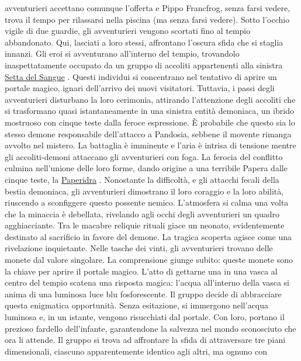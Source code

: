 avventurieri accettano comunque l'offerta e Pippo Francfrog, senza farsi
vedere, trova il tempo per rilassarsi nella piscina (ma senza farsi
vedere). Sotto l'occhio vigile di due guardie, gli avventurieri vengono
scortati fino al tempio abbandonato. Qui, lasciati a loro stessi,
affrontano l'oscura sfida che si staglia innanzi. Gli eroi si
avventurano all'interno del tempio, trovandolo inaspettatamente occupato
da un gruppo di accoliti appartenenti alla sinistra
\href{Setta\%20del\%20Sangue\%202859c4de945546eda0cee6fb151ef956.md}{Setta
del Sangue} . Questi individui si concentrano nel tentativo di aprire un
portale magico, ignari dell'arrivo dei nuovi visitatori. Tuttavia, i
passi degli avventurieri disturbano la loro cerimonia, attirando
l'attenzione degli accoliti che si trasformano quasi istantaneamente in
una sinistra entità demoniaca, un ibrido mostruoso con cinque teste
dalla feroce espressione. È probabile che questo sia lo stesso demone
responsabile dell'attacco a Pandosia, sebbene il movente rimanga avvolto
nel mistero. La battaglia è imminente e l'aria è intrisa di tensione
mentre gli accoliti-demoni attaccano gli avventurieri con foga. La
ferocia del conflitto culmina nell'unione delle loro forme, dando
origine a una terribile Papera dalle cinque teste, la
\href{Paperidra\%20fb14298e444f4526a49b518790283588.md}{Paperidra} .
Nonostante la difficoltà, e gli attacchi fecali della bestia demoniaca,
gli avventurieri dimostrano il loro coraggio e la loro abilità,
riuscendo a sconfiggere questo possente nemico. L'atmosfera si calma una
volta che la minaccia è debellata, rivelando agli occhi degli
avventurieri un quadro agghiacciante. Tra le macabre reliquie rituali
giace un neonato, evidentemente destinato al sacrificio in favore del
demone. La tragica scoperta agisce come una rivelazione inquietante.
Nelle tasche dei vinti, gli avventurieri trovano delle monete dal valore
singolare. La comprensione giunge subito: queste monete sono la chiave
per aprire il portale magico. L'atto di gettarne una in una vasca al
centro del tempio scatena una risposta magica: l'acqua all'interno della
vasca si anima di una luminosa luce blu fosforescente. Il gruppo decide
di abbracciare questa enigmatica opportunità. Senza esitazione, si
immergono nell'acqua luminosa e, in un istante, vengono risucchiati dal
portale. Con loro, portano il prezioso fardello dell'infante,
garantendone la salvezza nel mondo sconosciuto che ora li attende. Il
gruppo si trova ad affrontare la sfida di attraversare tre piani
dimensionali, ciascuno apparentemente identico agli altri, ma ognuno con
